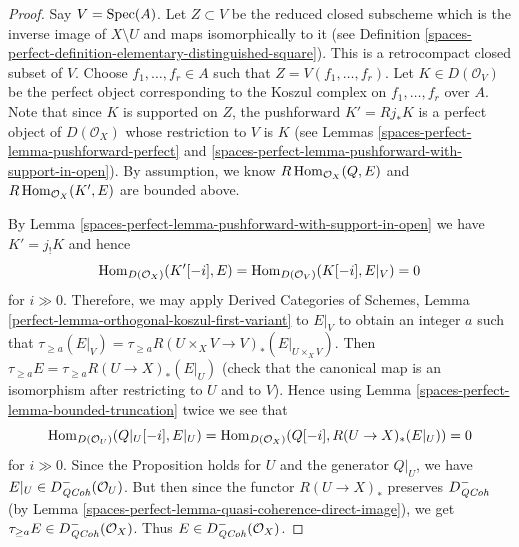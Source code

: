 \begin{proof}
\medskip\noindent
Say $V = \operatorname{Spec}(A)$. Let $Z \subset V$ be the reduced closed subscheme
which is the inverse image of $X \setminus U$ and maps isomorphically to it
(see Definition \ref{spaces-perfect-definition-elementary-distinguished-square}).
This is a retrocompact closed subset of $V$.
Choose $f_1, \ldots, f_r \in A$ such that
$Z = V(f_1, \ldots, f_r)$. Let $K \in D(\mathcal{O}_V)$ be the perfect
object corresponding to the Koszul complex on $f_1, \ldots, f_r$ over $A$.
Note that since $K$ is supported on $Z$, the pushforward
$K' = Rj_*K$ is a perfect object of $D(\mathcal{O}_X)$ whose
restriction to $V$ is $K$ (see Lemmas \ref{spaces-perfect-lemma-pushforward-perfect}
and \ref{spaces-perfect-lemma-pushforward-with-support-in-open}).
By assumption, we know $R\operatorname{Hom}_{\mathcal{O}_X}(Q, E)$ and
$R\operatorname{Hom}_{\mathcal{O}_X}(K', E)$ are bounded above.

\medskip\noindent
By Lemma \ref{spaces-perfect-lemma-pushforward-with-support-in-open}
we have $K' =  j_!K$ and hence
$$
\operatorname{Hom}_{D(\mathcal{O}_X)}(K'[-i], E) = \operatorname{Hom}_{D(\mathcal{O}_V)}(K[-i], E|_V) = 0
$$
for $i \gg 0$. Therefore, we may apply
Derived Categories of Schemes,
Lemma \ref{perfect-lemma-orthogonal-koszul-first-variant} to $E|_V$ to
obtain an integer $a$ such that
$\tau_{\geq a}(E|_V) =
\tau_{\geq a} R (U \times_X V \to V)_* (E|_{U \times_X V})$.
Then $\tau_{\geq a} E = \tau_{\geq a} R (U \to X)_* (E |_U)$
(check that the canonical map is an isomorphism after restricting to
$U$ and to $V$). Hence using Lemma \ref{spaces-perfect-lemma-bounded-truncation}
twice we see that
$$
\operatorname{Hom}_{D(\mathcal{O}_U)}(Q|_U [-i], E|_U) =
\operatorname{Hom}_{D(\mathcal{O}_X)}(Q[-i], R (U \to X)_* (E|_U)) = 0
$$
for $i \gg 0$. Since the Proposition holds for $U$ and the generator
$Q|_U$, we have $E|_U \in D^-_{\mathit{QCoh}}(\mathcal{O}_U)$. But then since
the functor $R (U \to X)_*$ preserves $D^-_{\mathit{QCoh}}$
(by Lemma \ref{spaces-perfect-lemma-quasi-coherence-direct-image}), we get
$\tau_{\geq a}E \in D^-_{\mathit{QCoh}}(\mathcal{O}_X)$. Thus
$E \in D^-_{\mathit{QCoh}} (\mathcal{O}_X)$.
\end{proof}

